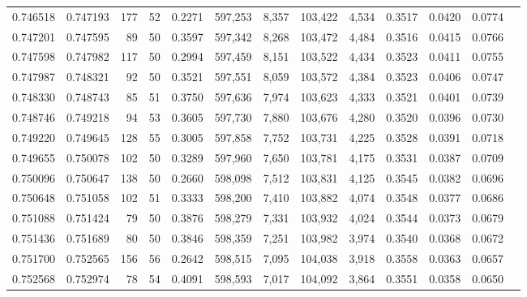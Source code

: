 \begin{tabular}{rrrrrrrrrrrrr}
0.746518 & 0.747193 &   177 &  52 &                                     0.2271 & 597,253 &   8,357 & 103,422 &   4,534 & 0.3517 & 0.0420 & 0.0774 \\
0.747201 & 0.747595 &    89 &  50 &                                     0.3597 & 597,342 &   8,268 & 103,472 &   4,484 & 0.3516 & 0.0415 & 0.0766 \\
0.747598 & 0.747982 &   117 &  50 &                                     0.2994 & 597,459 &   8,151 & 103,522 &   4,434 & 0.3523 & 0.0411 & 0.0755 \\
0.747987 & 0.748321 &    92 &  50 &                                     0.3521 & 597,551 &   8,059 & 103,572 &   4,384 & 0.3523 & 0.0406 & 0.0747 \\
0.748330 & 0.748743 &    85 &  51 &                                     0.3750 & 597,636 &   7,974 & 103,623 &   4,333 & 0.3521 & 0.0401 & 0.0739 \\
0.748746 & 0.749218 &    94 &  53 &                                     0.3605 & 597,730 &   7,880 & 103,676 &   4,280 & 0.3520 & 0.0396 & 0.0730 \\
0.749220 & 0.749645 &   128 &  55 &                                     0.3005 & 597,858 &   7,752 & 103,731 &   4,225 & 0.3528 & 0.0391 & 0.0718 \\
0.749655 & 0.750078 &   102 &  50 &                                     0.3289 & 597,960 &   7,650 & 103,781 &   4,175 & 0.3531 & 0.0387 & 0.0709 \\
0.750096 & 0.750647 &   138 &  50 &                                     0.2660 & 598,098 &   7,512 & 103,831 &   4,125 & 0.3545 & 0.0382 & 0.0696 \\
0.750648 & 0.751058 &   102 &  51 &                                     0.3333 & 598,200 &   7,410 & 103,882 &   4,074 & 0.3548 & 0.0377 & 0.0686 \\
0.751088 & 0.751424 &    79 &  50 &                                     0.3876 & 598,279 &   7,331 & 103,932 &   4,024 & 0.3544 & 0.0373 & 0.0679 \\
0.751436 & 0.751689 &    80 &  50 &                                     0.3846 & 598,359 &   7,251 & 103,982 &   3,974 & 0.3540 & 0.0368 & 0.0672 \\
0.751700 & 0.752565 &   156 &  56 &                                     0.2642 & 598,515 &   7,095 & 104,038 &   3,918 & 0.3558 & 0.0363 & 0.0657 \\
0.752568 & 0.752974 &    78 &  54 &                                     0.4091 & 598,593 &   7,017 & 104,092 &   3,864 & 0.3551 & 0.0358 & 0.0650 \\

\end{tabular}
